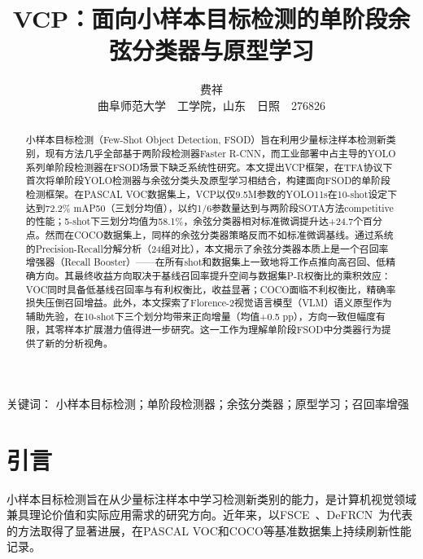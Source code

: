 \documentclass[zihao=5,a4paper,twocolumn]{ctexart}
\newenvironment{keywords}{\par\noindent\zihao{5}\heiti 关键词：}{\par}
\begin{document}
\title{VCP：面向小样本目标检测的单阶段余弦分类器与原型学习}

\author{费祥\\[2pt]
\songti 曲阜师范大学~~工学院，山东~~日照~~276826}

\maketitle

\begin{abstract}
小样本目标检测（Few-Shot Object Detection, FSOD）旨在利用少量标注样本检测新类别，现有方法几乎全部基于两阶段检测器Faster R-CNN，而工业部署中占主导的YOLO系列单阶段检测器在FSOD场景下缺乏系统性研究。本文提出VCP框架，在TFA协议下首次将单阶段YOLO检测器与余弦分类头及原型学习相结合，构建面向FSOD的单阶段检测框架。在PASCAL VOC数据集上，VCP以仅9.5M参数的YOLO11s在10-shot设定下达到72.2\% mAP50（三划分均值），以约1/6参数量达到与两阶段SOTA方法competitive的性能；5-shot下三划分均值为58.1\%，余弦分类器相对标准微调提升达+24.7个百分点。然而在COCO数据集上，同样的余弦分类器策略反而不如标准微调基线。通过系统的Precision-Recall分解分析（24组对比），本文揭示了余弦分类器本质上是一个召回率增强器（Recall Booster）——在所有shot和数据集上一致地将工作点推向高召回、低精确方向。其最终收益方向取决于基线召回率提升空间与数据集P-R权衡比的乘积效应：VOC同时具备低基线召回率与有利权衡比，收益显著；COCO面临不利权衡比，精确率损失压倒召回增益。此外，本文探索了Florence-2视觉语言模型（VLM）语义原型作为辅助先验，在10-shot下三个划分均带来正向增量（均值+0.5 pp），方向一致但幅度有限，其零样本扩展潜力值得进一步研究。这一工作为理解单阶段FSOD中分类器行为提供了新的分析视角。
\end{abstract}

\begin{keywords}
小样本目标检测；单阶段检测器；余弦分类器；原型学习；召回率增强
\end{keywords}


\section{引言}

小样本目标检测旨在从少量标注样本中学习检测新类别的能力，是计算机视觉领域兼具理论价值和实际应用需求的研究方向。近年来，以FSCE~\cite{sun2021fsce}、DeFRCN~\cite{qiao2021defrcn}为代表的方法取得了显著进展，在PASCAL VOC和COCO等基准数据集上持续刷新性能记录。
\end{document}
